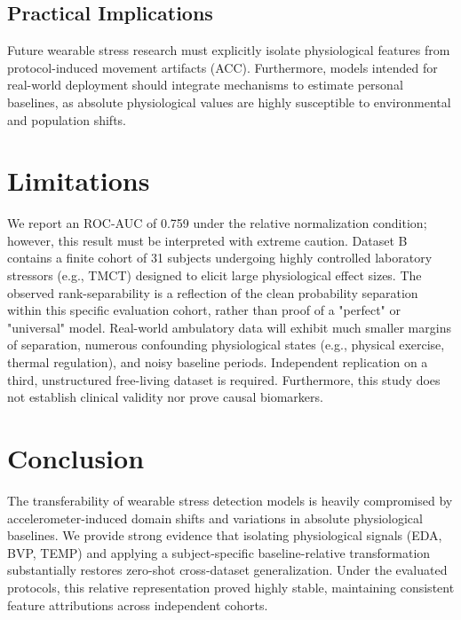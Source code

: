 \documentclass[journal]{IEEEtran}
\begin{document}
\subsection{Practical Implications}
Future wearable stress research must explicitly isolate physiological features from protocol-induced movement artifacts (ACC). Furthermore, models intended for real-world deployment should integrate mechanisms to estimate personal baselines, as absolute physiological values are highly susceptible to environmental and population shifts.

\section{Limitations}
We report an ROC-AUC of 0.759 under the relative normalization condition; however, this result must be interpreted with extreme caution. Dataset B contains a finite cohort of 31 subjects undergoing highly controlled laboratory stressors (e.g., TMCT) designed to elicit large physiological effect sizes. The observed rank-separability is a reflection of the clean probability separation within this specific evaluation cohort, rather than proof of a "perfect" or "universal" model. Real-world ambulatory data will exhibit much smaller margins of separation, numerous confounding physiological states (e.g., physical exercise, thermal regulation), and noisy baseline periods. Independent replication on a third, unstructured free-living dataset is required. Furthermore, this study does not establish clinical validity nor prove causal biomarkers.

\section{Conclusion}
The transferability of wearable stress detection models is heavily compromised by accelerometer-induced domain shifts and variations in absolute physiological baselines. We provide strong evidence that isolating physiological signals (EDA, BVP, TEMP) and applying a subject-specific baseline-relative transformation substantially restores zero-shot cross-dataset generalization. Under the evaluated protocols, this relative representation proved highly stable, maintaining consistent feature attributions across independent cohorts.
\end{document}
